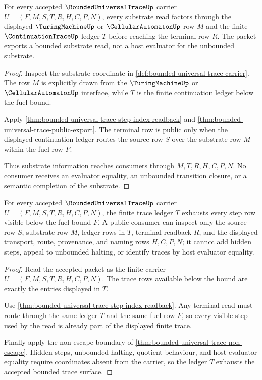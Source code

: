 \begin{theorem}
\label{thm:bounded-universal-trace-substrate-readback}
For every accepted $\BoundedUniversalTraceUp$ carrier $U=(F,M,S,T,R,H,C,P,N)$, every substrate read factors through the displayed $\TuringMachineUp$ or $\CellularAutomatonUp$ row $M$ and the finite $\ContinuationTraceUp$ ledger $T$ before reaching the terminal row $R$. The packet exports a bounded substrate read, not a host evaluator for the unbounded substrate.
\end{theorem}
\begin{proof}
Inspect the substrate coordinate in \autoref{def:bounded-universal-trace-carrier}. The row $M$ is explicitly drawn from the $\TuringMachineUp$ or $\CellularAutomatonUp$ interface, while $T$ is the finite continuation ledger below the fuel bound.

Apply \autoref{thm:bounded-universal-trace-step-index-readback} and \autoref{thm:bounded-universal-trace-public-export}. The terminal row is public only when the displayed continuation ledger routes the source row $S$ over the substrate row $M$ within the fuel row $F$.

Thus substrate information reaches consumers through $M,T,R,H,C,P,N$. No consumer receives an evaluator equality, an unbounded transition closure, or a semantic completion of the substrate.
\end{proof}

\begin{theorem}
\label{thm:bounded-universal-trace-ledger-exhaustion}
For every accepted $\BoundedUniversalTraceUp$ carrier $U=(F,M,S,T,R,H,C,P,N)$, the finite trace ledger $T$ exhausts every step row visible below the fuel bound $F$. A public consumer can inspect only the source row $S$, substrate row $M$, ledger rows in $T$, terminal readback $R$, and the displayed transport, route, provenance, and naming rows $H,C,P,N$; it cannot add hidden steps, appeal to unbounded halting, or identify traces by host evaluator equality.
\end{theorem}
\begin{proof}
Read the accepted packet as the finite carrier $U=(F,M,S,T,R,H,C,P,N)$. The trace rows available below the bound are exactly the entries displayed in $T$.

Use \autoref{thm:bounded-universal-trace-step-index-readback}. Any terminal read must route through the same ledger $T$ and the same fuel row $F$, so every visible step used by the read is already part of the displayed finite trace.

Finally apply the non-escape boundary of \autoref{thm:bounded-universal-trace-non-escape}. Hidden steps, unbounded halting, quotient behaviour, and host evaluator equality require coordinates absent from the carrier, so the ledger $T$ exhausts the accepted bounded trace surface.
\end{proof}

